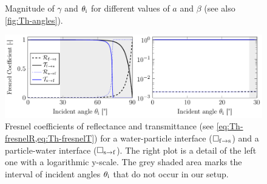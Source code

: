 \begin{figure}
\begin{subfigure}[b]{0.45\textwidth}
    \label{fig:Th-theta_i}
  \end{subfigure}
    \caption{Magnitude of $\gamma$ and $\theta_{\mathrm{i}}$ for different values of $a$ 
    and $\beta$ (see also \cref{fig:Th-angles}).}
  \label{fig:Th-gamma_theta}
\end{figure}

\begin{figure}[tbp]
  \centering
  \includegraphics[]{Plots/cache/Fresnel.pdf}
  \caption{Fresnel coefficients of reflectance and transmittance (see 
  \cref{eq:Th-fresnelR,eq:Th-fresnelT}) for a water-particle interface 
  ($\Box_{\mathrm{f}\rightarrow\mathrm{s}}$) and a particle-water interface 
($\Box_{\mathrm{s}\rightarrow\mathrm{f}}$). The right plot is a detail of the left one 
with a logarithmic y-scale. The grey shaded area marks the interval of incident 
angles $\theta_{\mathrm{i}}$ that do not occur in our setup.}
  \label{fig:Th-fresnel}
\end{figure}

